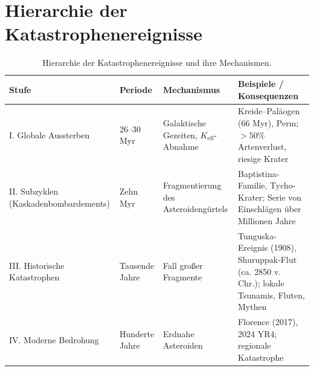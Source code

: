 \documentclass[11pt,a4paper]{article}
\begin{document}
	\section{Hierarchie der Katastrophenereignisse}
	
	\begin{table}[!ht]
		\centering
		\caption{Hierarchie der Katastrophenereignisse und ihre Mechanismen.}
		\label{tab:hierarchy}
		\scriptsize
		\begin{tabular}{p{3.5cm}p{2.4cm}p{3.4cm}p{7.5cm}}
			\toprule
			\textbf{Stufe} & \textbf{Periode} & \textbf{Mechanismus} & \textbf{Beispiele / Konsequenzen} \\
			\midrule
			I. Globale Aussterben & 26–30 Myr & Galaktische Gezeiten, \(K_{\mathrm{eff}}\)-Abnahme & Kreide–Paläogen (66 Myr), Perm; \(>50\%\) Artenverlust, riesige Krater \\
			II. Subzyklen (Kaskadenbombardements) & Zehn Myr & Fragmentierung des Asteroidengürtels & Baptistina-Familie, Tycho-Krater; Serie von Einschlägen über Millionen Jahre \\
			III. Historische Katastrophen & Tausende Jahre & Fall großer Fragmente & Tunguska-Ereignis (1908), Shuruppak-Flut (ca. 2850 v. Chr.); lokale Tsunamis, Fluten, Mythen \\
			IV. Moderne Bedrohung & Hunderte Jahre & Erdnahe Asteroiden & Florence (2017), 2024 YR4; regionale Katastrophe \\
			\bottomrule
		\end{tabular}
	\end{table}
	
\end{document}
